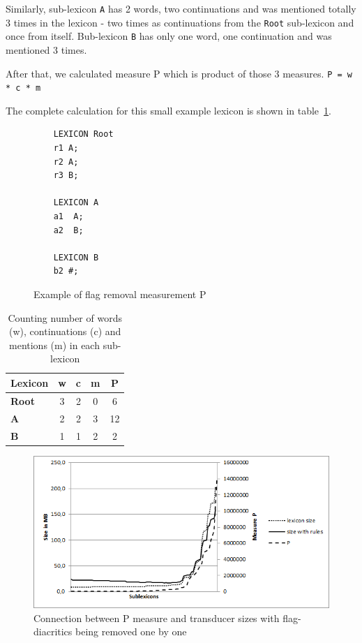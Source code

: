 \documentclass[10pt, a4paper]{article}
\begin{document}
Similarly, sub-lexicon \verb+A+ has 2 words, two continuations and was mentioned totally 3 times in the lexicon - 
two times as continuations from the \verb+Root+ sub-lexicon and once from itself. Bub-lexicon \verb+B+ has only one word, one continuation and was mentioned 3 times. 

After that, we calculated measure P which is product of 
those 3 measures.
\verb+P = w * c * m+

The complete calculation for this small example lexicon is shown in table~\ref{table:measureP}.

\begin{figure}
\centering
\begin{verbatim}
    LEXICON Root
    r1 A;
    r2 A;
    r3 B;
    
    LEXICON A
    a1  A;
    a2  B;
    
    LEXICON B
    b2 #;
    \end{verbatim}
  
    \caption{Example of flag removal measurement P
    \label{fig:lexc-measures}}
\end{figure}

\begin{table}
    \centering
    \begin{tabular}{|l|c|c|c|c|}
        \hline
        \bf Lexicon & \bf w & \bf c & \bf m & \bf P \\
        \hline
        \bf Root & 3 & 2 & 0 & 6  \\
        \bf A & 2 & 2 & 3 & 12 \\
        \bf B  & 1 & 1 & 2 & 2 \\
        \hline
    \end{tabular}
    \caption{Counting number of words (w), continuations (c) and mentions (m) in each sub-lexicon
    \label{table:measureP}}
\end{table}



\begin{figure}
    \includegraphics[width=\textwidth]{p-measure.png}
     \caption{Connection between P measure and transducer sizes with flag-diacritics being removed one by one
     \label{fig:p-measure-sizes}}
\end{figure}
\end{document}
